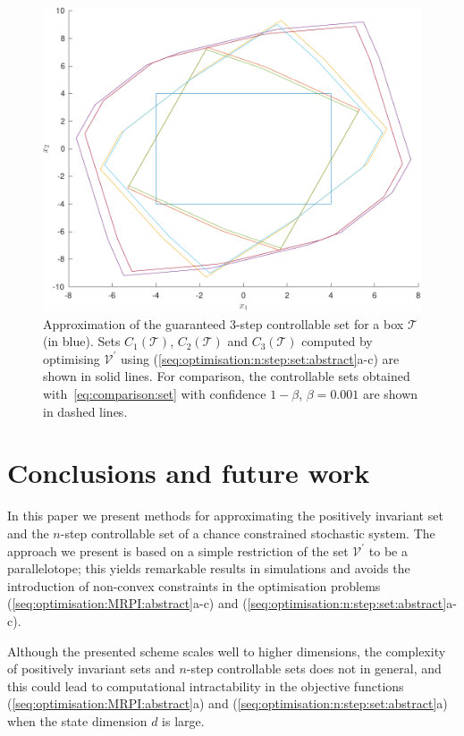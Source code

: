 \documentclass{ifacconf}
\providecommand{\V}{\mathcal V}
\providecommand{\T}{\mathcal T}
\begin{document}
\begin{figure}
\includegraphics[width=.95\linewidth]{NStepSetOptimised.pdf}
\caption{Approximation of the guaranteed 3-step controllable set for a box $\T$ (in blue). Sets $C_1(\T)$, $C_2(\T)$ and $C_3(\T)$ computed by optimising $\V^\prime$ using  (\ref{seq:optimisation:n:step:set:abstract}a-c) are shown in solid lines. For comparison, the controllable sets obtained with~\eqref{eq:comparison:set} with 
confidence $1-\beta$, $\beta = 0.001$ are shown in dashed lines.}
\label{fig:n:step:controllable:set}
\vspace{4mm}\end{figure}



\section{Conclusions and future work}\label{sec:conclusion}
%
%
In this paper we present methods for approximating the positively invariant set and the $n$-step controllable set of a chance constrained stochastic system.
%
The approach we present is based on a simple restriction of the set $\V^\prime$ to be a parallelotope; this yields remarkable results in simulations and avoids the introduction of non-convex constraints in the optimisation problems (\ref{seq:optimisation:MRPI:abstract}a-c) and \mbox{(\ref{seq:optimisation:n:step:set:abstract}a-c)}.

Although the presented scheme scales well to higher dimensions, the complexity of positively invariant sets and $n$-step controllable sets does not in general, and this could lead to computational intractability in the objective functions (\ref{seq:optimisation:MRPI:abstract}a) and (\ref{seq:optimisation:n:step:set:abstract}a) when the state dimension $d$ is large.
%
\end{document}
